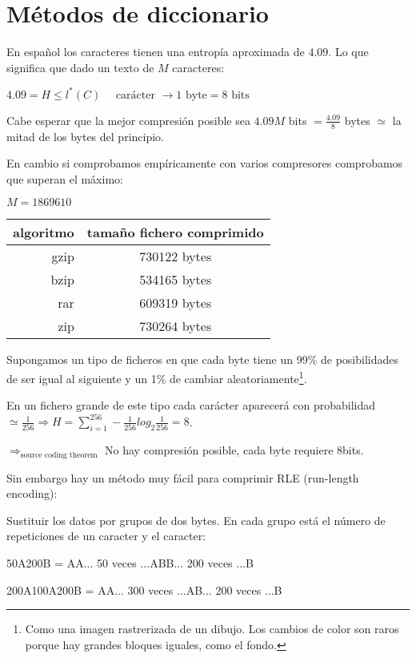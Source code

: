 \section{Métodos de diccionario}
	En español los caracteres tienen una entropía aproximada de $4.09$. Lo que significa que dado un texto de $M$ caracteres:

	$4.09 = H \leq l^{*} (C) \quad \text{ carácter } \rightarrow  1 \text{ byte} = 8 \text{ bits}$

	Cabe esperar que la mejor compresión posible sea $4.09M$ bits $= \frac{4.09}{8}$ bytes $\simeq$ la mitad de los bytes del principio.

	En cambio si comprobamos empíricamente con varios compresores comprobamos que superan el máximo:

	$M = 1869610$

	\begin{table}[h]
		\centering
		\begin{tabular}{r|c}
		algoritmo & tamaño fichero comprimido \\ \hline
		gzip & 730122 bytes \\
		bzip & 534165 bytes \\
		rar & 609319 bytes \\
		zip & 730264 bytes
		\end{tabular}
	\end{table}

	Supongamos un tipo de ficheros en que cada byte tiene un 99\% de posibilidades de ser igual al siguiente y un 1\% de cambiar aleatoriamente\footnote{Como una imagen rastrerizada de un dibujo. Los cambios de color son raros porque hay grandes bloques iguales, como el fondo.}.

	En un fichero grande de este tipo cada carácter aparecerá con probabilidad $\simeq \frac{1}{256} \Rightarrow H = \sum\limits^{256}_{i = 1} - \frac{1}{256} log_{2} \frac{1}{256} = 8$.

	$\Rightarrow_{\text{source coding theorem}}$ No hay compresión posible, cada byte requiere 8bits.

	Sin embargo hay un método muy fácil para comprimir RLE (run-length encoding):

	Sustituir los datos por grupos de dos bytes. En cada grupo está el número de repeticiones de un caracter y el caracter:

	50A200B = AA... 50 veces ...ABB... 200 veces ...B


	200A100A200B = AA... 300 veces ...AB... 200 veces ...B

